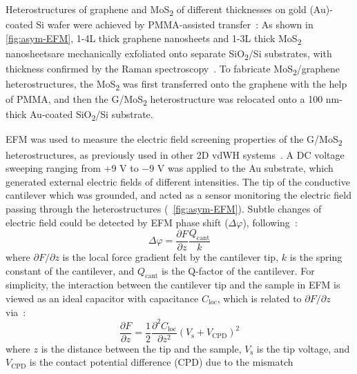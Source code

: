 Heterostructures of graphene and MoS\textsubscript{2} of different
thicknesses on gold (Au)-coated Si wafer were achieved by
PMMA-assisted transfer~\autocite{Minemawari_2011_inkjet_PMMA}:
%
As shown in \autoref{fig:asym-EFM}, 1-4L thick graphene nanosheets and 1-3L
thick MoS\textsubscript{2} nanosheetsare mechanically exfoliated onto
separate SiO\textsubscript{2}/Si substrates, with thickness confirmed
by the Raman
spectroscopy~\autocite{Ferrari_2006_raman,Lee_2010_anomal_raman_mos2,Chakraborty_2012_mos2_layer_raman}.
%
To fabricate MoS\textsubscript{2}/graphene heterostructures, the
MoS\textsubscript{2} was first transferred onto the graphene with the
help of PMMA, and then the G/MoS\textsubscript{2} hetero\-structure
was relocated onto a 100 nm-thick Au-coated SiO\textsubscript{2}/Si
substrate.
%

EFM was used to measure the electric field screening properties of the
G/MoS\textsubscript{2} heterostructures, as previously used in other
2D vdWH
systems~\autocite{Datta_2009_ML_Screening,Castellanos_Gomez_2012_interlayer,Li_2014_screen}.
%
A DC voltage sweeping ranging from +9 V to −9 V was applied to the Au
substrate, which generated external electric fields of different
intensities. The tip of the conductive cantilever which was grounded,
and acted as a sensor monitoring the electric field passing through
the heterostructures (~\autoref{fig:asym-EFM}).
%
Subtle changes of electric field could be detected by EFM phase shift
($\Delta \varphi$), following~\autocite{Li_2014_screen}:
\begin{equation}
  \label{eq:asym-phase-change}
  \Delta \varphi = \frac{\partial F}{\partial z} \frac{Q_{\mathrm{cant}}}{k} 
\end{equation}
where $\partial F/ \partial z$ is the local force gradient felt by the
cantilever tip, $k$ is the spring constant of the cantilever, and $Q_{\mathrm{cant}}$
is the Q-factor of the cantilever.
%
For simplicity, the interaction between the cantilever tip and the
sample in EFM is viewed as an ideal capacitor with capacitance
$C_{\mathrm{loc}}$, which is related to $\partial F/ \partial z$ via~\autocite{Li_2014_screen}:
\begin{equation}
  \label{eq:asym-capaci-cant}
  \frac{\partial F}{\partial z} = \frac{1}{2} \frac{\partial^{2} C_{\mathrm{loc}}}{\partial z^{2}} (V_{\mathrm{s}} + V_{\mathrm{CPD}})^{2}
\end{equation}
where $z$ is the distance between the tip
and the sample, $V_{\mathrm{s}}$ is the tip voltage, and $V_{\mathrm{CPD}}$ is the contact potential difference (CPD) due to the mismatch
